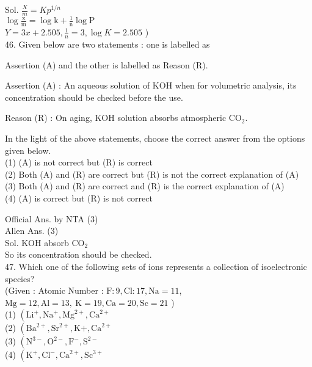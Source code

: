 \documentclass[10pt]{article}
\begin{document}
Sol. \(\frac{X}{m}=K p^{1 / n}\)\\
\(\log \frac{\mathrm{x}}{\mathrm{m}}=\log \mathrm{k}+\frac{1}{\mathrm{n}} \log \mathrm{P}\)\\
\(Y=3 x+2.505, \frac{1}{n}=3, \log K=2.505\) )\\
46. Given below are two statements : one is labelled as

Assertion (A) and the other is labelled as Reason (R).

Assertion (A) : An aqueous solution of KOH when for volumetric analysis, its concentration should be checked before the use.

Reason (R) : On aging, KOH solution absorbs atmospheric \(\mathrm{CO}_{2}\).

In the light of the above statements, choose the correct answer from the options given below.\\
(1) (A) is not correct but (R) is correct\\
(2) Both (A) and (R) are correct but (R) is not the correct explanation of (A)\\
(3) Both (A) and (R) are correct and (R) is the correct explanation of (A)\\
(4) (A) is correct but (R) is not correct

Official Ans. by NTA (3)\\
Allen Ans. (3)\\
Sol. KOH absorb \(\mathrm{CO}_{2}\)\\
So its concentration should be checked.\\
47. Which one of the following sets of ions represents a collection of isoelectronic species?\\
(Given : Atomic Number : \(\mathrm{F}: 9, \mathrm{Cl}: 17, \mathrm{Na}=11\),\\
\(\mathrm{Mg}=12, \mathrm{Al}=13, \mathrm{~K}=19, \mathrm{Ca}=20, \mathrm{Sc}=21\) )\\
(1) \(\left(\mathrm{Li}^{+}, \mathrm{Na}^{+}, \mathrm{Mg}^{2+}, \mathrm{Ca}^{2+}\right.\)\\
(2) \(\left(\mathrm{Ba}^{2+}, \mathrm{Sr}^{2+}, \mathrm{K}+, \mathrm{Ca}^{2+}\right.\)\\
(3) \(\left(\mathrm{N}^{3-}, \mathrm{O}^{2-}, \mathrm{F}^{-}, \mathrm{S}^{2-}\right.\)\\
(4) \(\left(\mathrm{K}^{+}, \mathrm{Cl}^{-}, \mathrm{Ca}^{2+}, \mathrm{Sc}^{3+}\right.\)
\end{document}
